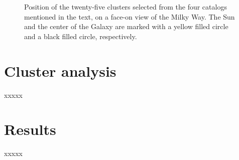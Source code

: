 \documentclass{aa}
\begin{document}
 \begin{figure}
  \caption{Position of the twenty-five clusters selected from the four catalogs
  mentioned in the text, on a face-on view of the Milky Way. The Sun and the
  center of the Galaxy are marked with a yellow filled circle and a black
  filled circle, respectively.}
  \label{fig:MWmap}
 \end{figure}





\section{Cluster analysis}
 \label{sec:clust_analy}

 xxxxx





\section{Results}
 \label{sec:results}

 xxxxx
\end{document}
